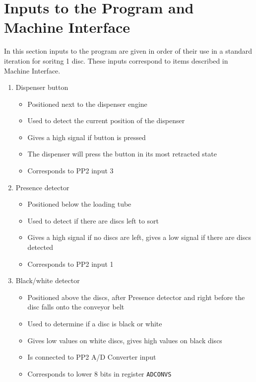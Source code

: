 \documentclass[a4paper,oneside,11pt]{report}
\begin{document}
\section{Inputs to the Program and Machine Interface}
In this section inputs to the program are given in order of their use in a standard iteration for soritng 1 disc. These inputs correspond to items described in Machine Interface.
\begin{enumerate}
\item Dispenser button
\begin{itemize}
\item Positioned next to the dispenser engine
\item Used to detect the current position of the dispenser
\item Gives a high signal if button is pressed
\item The dispenser will press the button in its most retracted state
\item Corresponds to PP2 input 3
\end{itemize}
\item Presence detector
\begin{itemize}
\item Positioned below the loading tube
\item Used to detect if there are discs left to sort
\item Gives a high signal if no discs are left, gives a low signal if there are discs detected
\item Corresponds to PP2 input 1
\end{itemize}
\item Black/white detector
\begin{itemize}
\item Positioned above the discs, after Presence detector and right before the disc falls onto the conveyor belt
\item Used to determine if a disc is black or white
\item Gives low values on white discs, gives high values on black discs
\item Is connected to PP2 A/D Converter input
\item Corresponds to lower 8 bits in register \texttt{ADCONVS}
\end{itemize}

\pagebreak


\end{enumerate}
\end{document}
